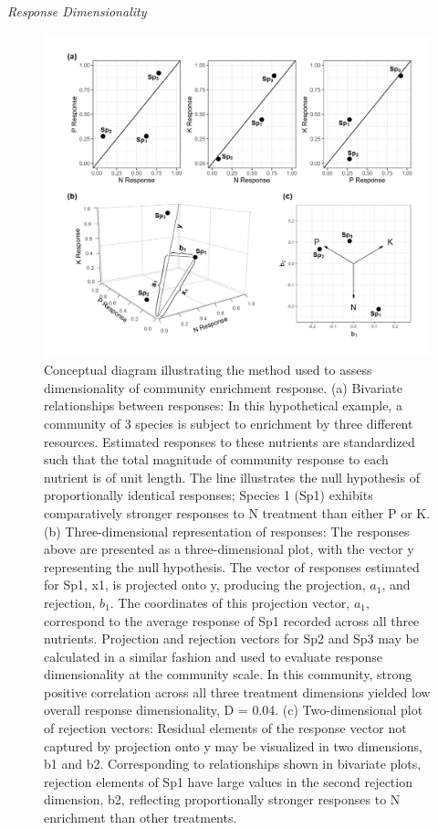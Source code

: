 \documentclass[twoside,12pt,final]{ucthesis-CA2012}
\begin{document}
\begin{ucmainmatter}
\emph{Response Dimensionality}
\begin{figure}
\centering
\includegraphics[width=\textwidth,height=0.6\textheight]{figure/Fig1_1.png}
\caption{Conceptual diagram illustrating the method used to assess dimensionality of community enrichment response. \newline (a) Bivariate relationships between responses: In this hypothetical example, a community of 3 species is subject to enrichment by three different resources. Estimated responses to these nutrients are standardized such that the total magnitude of community response to each nutrient is of unit length. The line illustrates the null hypothesis of proportionally identical responses; Species 1 (Sp1) exhibits comparatively stronger responses to N treatment than either P or K. \newline (b) Three-dimensional representation of responses: The responses above are presented as a three-dimensional plot, with the vector y representing the null hypothesis. The vector of responses estimated for Sp1, x1, is projected onto y, producing the projection, \(a_1\), and rejection, \(b_1\). The coordinates of this projection vector, \(a_1\), correspond to the average response of Sp1 recorded across all three nutrients. Projection and rejection vectors for Sp2 and Sp3 may be calculated in a similar fashion and used to evaluate response dimensionality at the community scale. In this community, strong positive correlation across all three treatment dimensions yielded low overall response dimensionality, D = 0.04. \newline (c) Two-dimensional plot of rejection vectors: Residual elements of the response vector not captured by projection onto y may be visualized in two dimensions, b1 and b2. Corresponding to relationships shown in bivariate plots, rejection elements of Sp1 have large values in the second rejection dimension, b2, reflecting proportionally stronger responses to N enrichment than other treatments. \label{fig-1-1}}

\end{figure}
\end{ucmainmatter}
\end{document}
